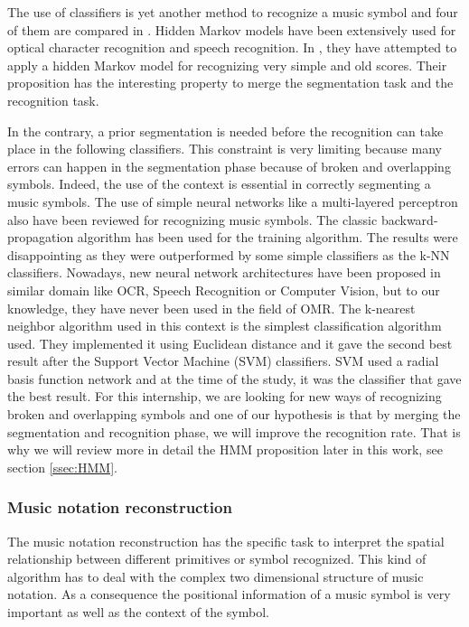 \documentclass[11pt]{sdm}
\begin{document}
The use of classifiers is yet another method to recognize a music symbol and four of them are compared in \cite{rebelo_optical_2009}.
Hidden Markov models have been extensively used for optical character recognition and speech recognition.
In \cite{pugin_optical_2006}, they have attempted to apply a hidden Markov model for recognizing very simple and old scores.
Their proposition has the interesting property to merge the segmentation task and the recognition task.

In the contrary, a prior segmentation is needed before the recognition can take place in the following classifiers.
This constraint is very limiting because many errors can happen in the segmentation phase because of broken and overlapping symbols.
Indeed, the use of the context is essential in correctly segmenting a music symbols.
The use of simple neural networks like a multi-layered perceptron also have been reviewed for recognizing music symbols.
The classic backward-propagation algorithm has been used for the training algorithm.
The results were disappointing as they were outperformed by some simple classifiers as the k-NN classifiers.
Nowadays, new neural network architectures have been proposed in similar domain like OCR, Speech Recognition or Computer Vision, but to our knowledge, they have never been used in the field of OMR.
The k-nearest neighbor algorithm used in this context is the simplest classification algorithm used.
They implemented it using Euclidean distance and it gave the second best result after the Support Vector Machine (SVM) classifiers.
SVM used a radial basis function network and at the time of the study, it was the classifier that gave the best result.
For this internship, we are looking for new ways of recognizing broken and overlapping symbols and one of our hypothesis is that by merging the segmentation and recognition phase, we will improve the recognition rate.
That is why we will review more in detail the HMM proposition later in this work, see section \ref{ssec:HMM}.

\subsubsection{Music notation reconstruction}

The music notation reconstruction has the specific task to interpret the spatial relationship between different primitives or symbol recognized.
This kind of algorithm has to deal with the complex two dimensional structure of music notation.
As a consequence the positional information of a music symbol is very important as well as the context of the symbol.
\end{document}
